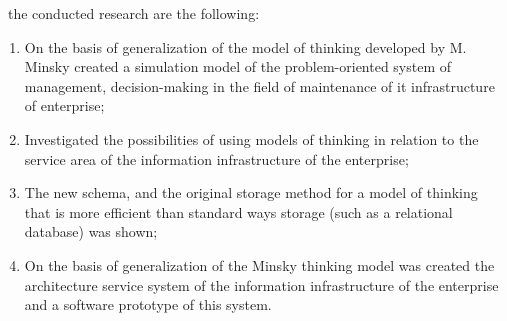 \novelty\ the conducted research are the following:
\begin{enumerate}
  \item On the basis of generalization of the model of thinking developed by M. Minsky created a simulation model of the problem-oriented system of management, decision-making in the field of maintenance of it infrastructure of enterprise;
  \item Investigated the possibilities of using models of thinking in relation to the service area of the information infrastructure of the enterprise;
  \item The new schema, and the original storage method for a model of thinking that is more efficient than standard ways storage (such as a relational database) was shown;
  \item On the basis of generalization of the Minsky thinking model was created the architecture service system of the information infrastructure of the enterprise and a software prototype of this system.
\end{enumerate}

